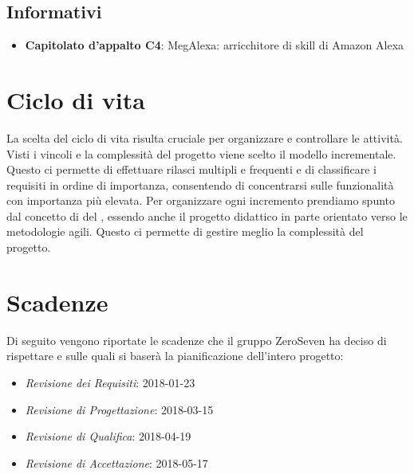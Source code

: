 \subsection{Informativi}
\begin{itemize}
	\item \textbf{Capitolato d'appalto C4}: MegAlexa: arricchitore di skill di Amazon Alexa
\end{itemize}
\section{Ciclo di vita}
La scelta del ciclo di vita risulta cruciale per organizzare e controllare le attività. Visti i vincoli e la complessità del progetto viene scelto il modello incrementale. Questo ci permette di effettuare rilasci multipli e frequenti e di classificare i requisiti in ordine di importanza, consentendo di concentrarsi sulle funzionalità con importanza più elevata. Per organizzare ogni incremento prendiamo spunto dal concetto di  del  , essendo anche il progetto didattico in parte orientato verso le metodologie agili. Questo ci permette di gestire meglio la complessità del progetto.
\section{Scadenze}
Di seguito vengono riportate le scadenze che il gruppo ZeroSeven ha deciso di rispettare e sulle quali si baserà la pianificazione dell'intero progetto:
\begin{itemize}
	\item \textit{Revisione dei Requisiti}: 2018-01-23
	\item \textit{Revisione di Progettazione}: 2018-03-15
	\item \textit{Revisione di Qualifica}: 2018-04-19
	\item \textit{Revisione di Accettazione}: 2018-05-17
\end{itemize}